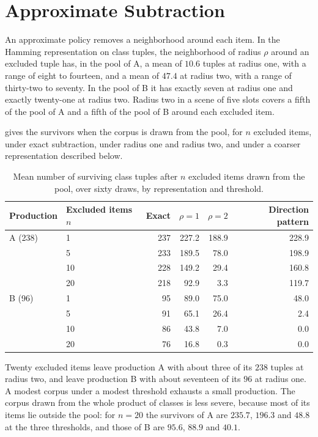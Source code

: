 \documentclass[11pt,twoside,openright]{book}
\theoremstyle{plain}
\theoremstyle{definition}
\theoremstyle{remark}
\begin{document}
\section{Approximate Subtraction}\label{sec:approx15}

An approximate policy removes a neighborhood around each item. In the Hamming representation on class tuples, the neighborhood of radius $\rho$ around an excluded tuple has, in the pool of A, a mean of $10.6$ tuples at radius one, with a range of eight to fourteen, and a mean of $47.4$ at radius two, with a range of thirty-two to seventy. In the pool of B it has exactly seven at radius one and exactly twenty-one at radius two. Radius two in a scene of five slots covers a fifth of the pool of A and a fifth of the pool of B around each excluded item.

 gives the survivors when the corpus is drawn from the pool, for $n$ excluded items, under exact subtraction, under radius one and radius two, and under a coarser representation described below.

\begin{table}[ht]
\centering
\begin{tabular}{@{}llrrrr@{}}
\toprule
Production & Excluded items $n$ & Exact & $\rho=1$ & $\rho=2$ & Direction pattern\\
\midrule
A (238) & 1 & 237 & 227.2 & 188.9 & 228.9\\
 & 5 & 233 & 189.5 & 78.0 & 198.9\\
 & 10 & 228 & 149.2 & 29.4 & 160.8\\
 & 20 & 218 & 92.9 & 3.3 & 119.7\\
\midrule
B (96) & 1 & 95 & 89.0 & 75.0 & 48.0\\
 & 5 & 91 & 65.1 & 26.4 & 2.4\\
 & 10 & 86 & 43.8 & 7.0 & 0.0\\
 & 20 & 76 & 16.8 & 0.3 & 0.0\\
\bottomrule
\end{tabular}
\caption{Mean number of surviving class tuples after $n$ excluded items drawn from the pool, over sixty draws, by representation and threshold.}\label{tab:surv15}
\end{table}

Twenty excluded items leave production A with about three of its $238$ tuples at radius two, and leave production B with about seventeen of its $96$ at radius one. A modest corpus under a modest threshold exhausts a small production. The corpus drawn from the whole product of classes is less severe, because most of its items lie outside the pool: for $n=20$ the survivors of A are $235.7$, $196.3$ and $48.8$ at the three thresholds, and those of B are $95.6$, $88.9$ and $40.1$.
\end{document}
